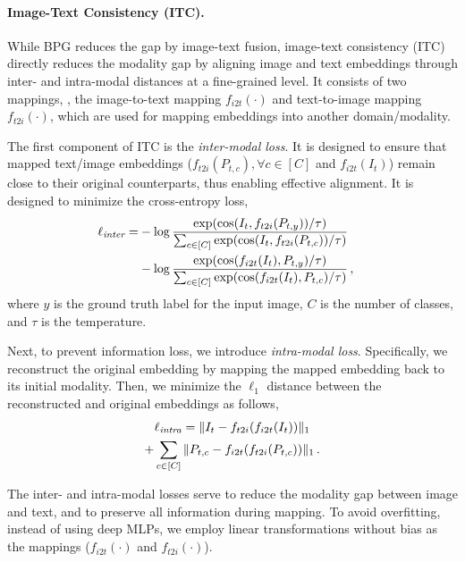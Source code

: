 \noindent
\paragraph{Image-Text Consistency (ITC).}
While BPG reduces the gap by image-text fusion, image-text consistency (ITC) directly reduces the modality gap by aligning image and text embeddings through inter- and intra-modal distances at a fine-grained level.
It consists of two mappings, \ie, the image-to-text mapping $f_{i2t}(\cdot)$ and text-to-image mapping $f_{t2i}(\cdot)$, which are used for mapping embeddings into another domain/modality. 

The first component of ITC is the \emph{inter-modal loss}. 
It is designed to ensure that mapped text/image embeddings ($f_{t2i}(P_{t,c}), \forall c \in [C]$ and $f_{i2t}(I_t)$) remain close to their original counterparts, thus enabling effective alignment. 
It is designed to minimize the cross-entropy loss,
\begin{align}
\small
\label{loss: inter}
    \ell_{\textit{inter}} = & -\log \frac{\exp({\operatorname{cos}(I_t, f_{t2i}(P_{t,y})) / \tau})}{\sum_{c \in [C]} \exp({\operatorname{cos}(I_t, f_{t2i}(P_{t,c})) / \tau})} &\\
    &- \log \frac{\exp({\operatorname{cos}(f_{i2t}(I_t), P_{t,y}) / \tau})}{\sum_{c \in [C]} \exp({\operatorname{cos}(f_{i2t}(I_t), P_{t,c}) / \tau})} \,,\nonumber
\end{align}
where $y$ is the ground truth label for the input image, $C$ is the number of classes, and $\tau$ is the temperature. 

Next, to prevent information loss, we introduce \emph{intra-modal loss}. 
Specifically, we reconstruct the original embedding by mapping the mapped embedding back to its initial modality.
Then, we minimize the $\ell_1$ distance between the reconstructed and original embeddings as follows,
\begin{multline}
\small
\label{loss: intra}
\ell_{\textit{intra}} = \|I_t - f_{t2i}(f_{i2t}(I_t)) \|_1 \\
    + \sum_{c \in [C]} \| P_{t,c} - f_{i2t}(f_{t2i} (P_{t,c})) \|_1 \,.
\end{multline}

The inter- and intra-modal losses serve to reduce the modality gap between image and text, and to preserve all information during mapping. 
To avoid overfitting, instead of using deep MLPs, we employ linear transformations without bias as the mappings ($f_{i2t}(\cdot)$ and $f_{t2i}(\cdot)$). 


